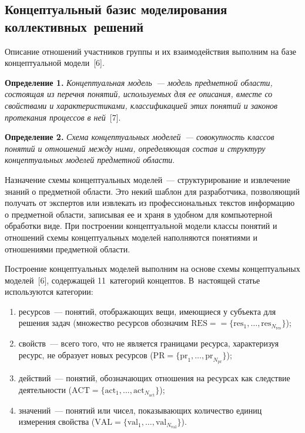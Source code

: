 \begin{multicols}{2}
\section{Концептуальный базис моделирования коллективных~решений}

\vspace*{-2pt}
  
  Описание отношений участников группы и их взаимодействия выполним на 
базе концептуальной модели~[6].
  
  \smallskip
  \noindent
  \textbf{Определение 1.} \textit{Концептуальная модель~--- модель 
предметной области, состоящая из перечня понятий, используемых для ее 
описания, вместе со свойствами и характеристиками, классификацией этих 
понятий и законов протекания процессов в ней}~[7].
  
  \smallskip
  
  \noindent
  \textbf{Определение 2.} \textit{Схема концептуальных моделей~--- 
совокупность классов понятий и отношений между ними, определяющая 
состав и структуру концептуальных моделей предметной области}.
  
  \smallskip
  
  Назначение схемы концептуальных моделей~--- структурирование и 
извлечение знаний о предметной области. Это некий шаблон для разработчика, 
позволяющий получать от экспертов или извлекать из профессиональных 
текстов информацию о предметной области, записывая ее и храня в удобном 
для компьютерной обработки виде. При построении концептуальной модели 
классы понятий и отношений схемы концептуальных моделей наполняются 
понятиями и отношениями предметной области.
  
  Построение концептуальных моделей выполним на основе схемы 
концептуальных моделей~[6], содержащей 11~категорий концептов. 
В~настоящей статье используются категории: 
  \begin{enumerate}[(1)]
  \item ресурсов~--- понятий, отображающих вещи, имеющиеся у субъекта для 
решения задач (множество ресурсов обозначим  $\mathrm{RES} =$\linebreak $=\{\mathrm{res}_1,\ldots , 
\mathrm{res}_{N_{\mathrm{res}}}\}$); 
  \item свойств~--- всего того, что не является границами ресурса, характеризуя 
ресурс, не образует новых ресурсов ($\mathrm{PR} =\{ \mathrm{pr}_1,\ldots , \mathrm{pr}_{N_{\mathrm{pr}}}\}$); 
  \item действий~--- понятий, обозначающих отношения на ресурсах как 
следствие деятельности ($\mathrm{ACT} =\{\mathrm{act}_1, \ldots , \mathrm{act}_{N_{\mathrm{act}}}\}$); 
  \item значений~--- понятий или чисел, по\-ка\-зы\-ва\-ющих количество единиц 
измерения свойства ($\mathrm{VAL} = \{ \mathrm{val}_1,\ldots , \mathrm{val}_{N_{\mathrm{val}}}\}$).
  \end{enumerate}
  

\end{multicols}
